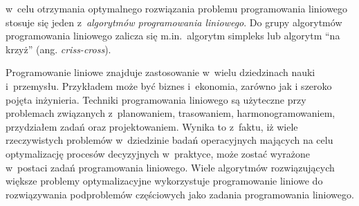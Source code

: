 \par{
  w~celu otrzymania optymalnego rozwiązania problemu programowania liniowego
  stosuje się jeden z~\emph{algorytmów programowania liniowego}.
  Do grupy algorytmów programowania liniowego zalicza się m.in.\ algorytm
  simpleks lub algorytm ``na krzyż'' (ang. \emph{criss-cross}).
}
\par{
  Programowanie liniowe znajduje zastosowanie w~wielu dziedzinach nauki i~przemysłu. 
  Przykładem może być biznes i~ekonomia, zarówno jak i szeroko pojęta inżynieria.
  Techniki programowania liniowego są użyteczne przy problemach związanych 
  z~planowaniem, trasowaniem, harmonogramowaniem, przydziałem zadań oraz
  projektowaniem.
  Wynika to z~faktu, iż wiele rzeczywistych problemów w~dziedzinie badań
  operacyjnych mających na celu optymalizację procesów decyzyjnych w~praktyce,
  może zostać wyrażone w~postaci zadań programowania liniowego.
  Wiele algorytmów rozwiązujących większe problemy optymalizacyjne wykorzystuje
  programowanie liniowe do rozwiązywania podproblemów częściowych jako zadania 
  programowania liniowego.
}
